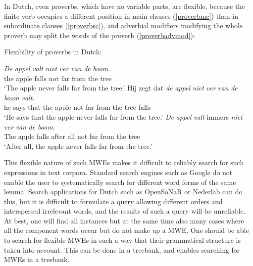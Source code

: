 \documentclass[output=paper,colorlinks,citecolor=brown]{langscibook}
\begin{document}
In Dutch, even proverbs, which have no variable parts, are flexible, because the finite verb occupies a different position in main clauses (\ref{proverbmc}) than in subordinate clauses (\ref{proverbsc}), and adverbial modifiers modifying the whole proverb may split the words of the proverb (\ref{proverbadvmod}):

\begin{exe}
    \ex Flexibility of proverbs in Dutch:
    \begin{xlist}
    \ex \label{proverbmc} \gll \textit{De} \textit{appel} \textit{valt} \textit{niet} \textit{ver} \textit{van} \textit{de} \textit{boom}.\\
    the apple falls not far from the tree\\
    \glt `The apple never falls far from the tree.'
    \ex \label {proverbsc}
     \gll Hij zegt dat \textit{de} \textit{appel} \textit{niet} \textit{ver} \textit{van} \textit{de} \textit{boom} \textit{valt}. \\
    he says that the apple not far from the tree falls\\
    \glt `He says that the apple never falls far from the tree.' 
    \ex \gll \textit{De} \textit{appel} \textit{valt} immers \textit{niet} \textit{ver} \textit{van} \textit{de} \textit{boom}.\\
    The apple falls {after all} not far from the tree\\
    \glt `After all, the apple never falls far from the tree.'
    \label{proverbadvmod}
    \end{xlist}
\end{exe}

This flexible nature of such MWEs makes it difficult to reliably search for such expressions in text corpora. Standard search engines such as Google do not enable the user to systematically search for different word forms of the same lemma.  Search applications for Dutch such as OpenSoNaR \citep{Camp:etal:CLC19,Does:etal:CLC20} or Nederlab \citep{BRUGMAN16.471} can do this, but it is difficult to formulate a query allowing different orders and interspersed irrelevant words, and the results of such a query will be  unreliable. At best, one will find all instances but  at the same time also many cases where all the component words occur but do not make up a MWE. One should be able to search for flexible MWEs in such a way that their grammatical structure is taken into account. This can be done in a treebank, and {\mwefinder} enables searching for MWEs in a treebank.
\end{document}
